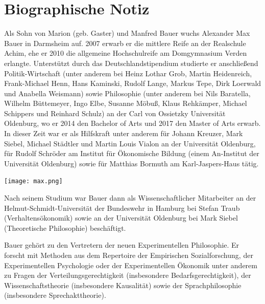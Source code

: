 \documentclass[justified,nobib,nohyper,symmetric,twoside]{tufte-book}
\begin{document}
\cleardoublepage
\chapter*{Biographische Notiz}
Als Sohn von Marion (geb. Gaster) und Manfred Bauer wuchs Alexander Max Bauer in Darmsheim auf.
2007 erwarb er die mittlere Reife an der Realschule Achim, ehe er 2010 die allgemeine Hochschulreife am Domgymnasium Verden erlangte.
Unterstützt durch das Deutschlandstipendium studierte er anschließend Politik-Wirtschaft (unter anderem bei Heinz Lothar Grob, Martin Heidenreich, Frank-Michael Henn, Hans Kaminski, Rudolf Lange, Markus Tepe, Dirk Loerwald und Anabella Weismann) sowie Philosophie (unter anderem bei Nils Baratella, Wilhelm Büttemeyer, Ingo Elbe, Susanne Möbuß, Klaus Rehkämper, Michael Schippers und Reinhard Schulz) an der Carl von Ossietzky Universität Oldenburg, wo er 2014 den Bachelor of Arts und 2017 den Master of Arts erwarb.
In dieser Zeit war er als Hilfskraft unter anderem für Johann Kreuzer, Mark Siebel, Michael Städtler und Martin Louis Vialon an der Universität Oldenburg, für Rudolf Schröder am Institut für Ökonomische Bildung (einem An-Institut der Universität Oldenburg) sowie für Matthias Bormuth am Karl-Jaspers-Haus tätig.

\begin{marginfigure}[-200pt]
   \texttt{[image: max.png]}
\end{marginfigure}


Nach seinem Studium war Bauer dann als Wissenschaftlicher Mitarbeiter an der Helmut-Schmidt-Universität der Bundeswehr in Hamburg bei Stefan Traub (Verhaltensökonomik) sowie an der Universität Oldenburg bei Mark Siebel (Theoretische Philosophie) beschäftigt.

Bauer gehört zu den Vertretern der neuen Experimentellen Philosophie.
Er forscht mit Methoden aus dem Repertoire der Empirischen Sozialforschung, der Experimentellen Psychologie oder der Experimentellen Ökonomik unter anderem zu Fragen der Verteilungsgerechtigkeit (insbesondere Bedarfsgerechtigkeit), der Wissenschaftstheorie (insbesondere Kausalität) sowie der Sprachphilosophie (insbesondere Sprechakttheorie).
\end{document}
